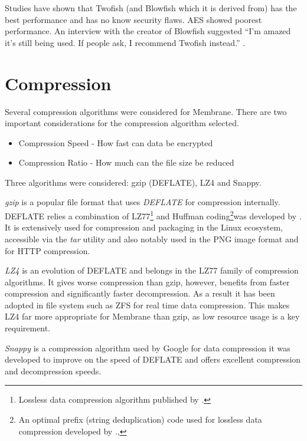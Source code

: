 \documentclass[11pt, a4paper, twocolumn, twoside]{report}
\begin{document}
Studies have shown that Twofish (and Blowfish which it is derived from) has the best performance and has no know security flaws. AES showed poorest performance. \citep*{thakur2011aes, rizvi2011performance, mushtaque2014evaluation} An interview with the creator of Blowfish suggested ``I'm amazed it's still being used. If people ask, I recommend Twofish instead.'' \cite{fish2007bruce}.

\section{Compression} \label{sec:compression}

Several compression algorithms were considered for Membrane. There are two important considerations for the compression algorithm selected.

\begin{itemize}
 \item Compression Speed - How fast can data be encrypted
 \item Compression Ratio - How much can the file size be reduced
\end{itemize}

Three algorithms were considered: gzip (DEFLATE), LZ4 and Snappy.

\emph{gzip} is a popular file format that uses \emph{DEFLATE} for compression internally. DEFLATE relies a combination of LZ77\footnote{Lossless data compression algorithm published by \cite{ziv1977universal}.} and Huffman coding\footnote{An optimal prefix (string deduplication) code used for lossless data compression developed by \cite{huffman1952method}., }was developed by \cite{deutsch1996deflate}. It is extensively used for compression and packaging in the Linux ecosystem, accessible via the \emph{tar} utility and also notably used in the PNG image format and for HTTP compression.

\emph{LZ4} is an evolution of DEFLATE and belongs in the LZ77 family of compression algorithms. It gives worse compression than gzip, however, benefits from faster compression and significantly faster decompression. \citep{legesse2014performance} As a result it has been adopted in file system such as ZFS for real time data compression. This makes LZ4 far more appropriate for Membrane than gzip, as low resource usage is a key requirement.

\emph{Snappy} is a compression algorithm used by Google for data compression it was developed to improve on the speed of DEFLATE and offers excellent compression and decompression speeds. \citep{google2017snappy}
\end{document}
